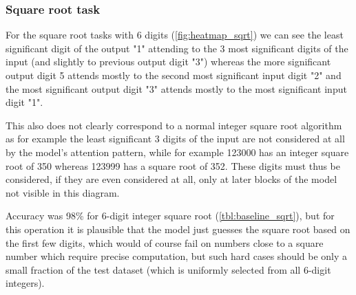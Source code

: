 


\FloatBarrier
\subsubsection{Square root task}

For the square root tasks with 6 digits (\cref{fig:heatmap_sqrt}) we can see the least significant digit of the output "1" attending to the 3 most significant digits of the input (and slightly to previous output digit "3") whereas the more significant output digit 5 attends mostly to the second most significant input digit "2" and the most significant output digit "3" attends mostly to the most significant input digit "1".

This also does not clearly correspond to a normal integer square root algorithm as for example the least significant 3 digits of the input are not considered at all by the model's attention pattern, while for example 123000 has an integer square root of 350 whereas 123999 has a square root of 352. These digits must thus be considered, if they are even considered at all, only at later blocks of the model not visible in this diagram.

Accuracy was 98\% for 6-digit integer square root (\cref{tbl:baseline_sqrt}), but for this operation it is plausible that the model just guesses the square root based on the first few digits, which would of course fail on numbers close to a square number which require precise computation, but such hard cases should be only a small fraction of the test dataset (which is uniformly selected from all 6-digit integers).

